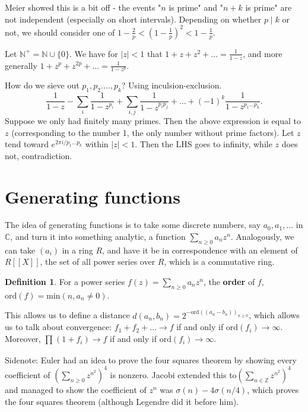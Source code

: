 \documentclass{article}
\theoremstyle{definition}
\newtheorem{defn}{Definition}[section]
\theoremstyle{remark}
\begin{document}
Meier showed this is a bit off - the events "$n$ is prime" and "$n+k$ is prime" are not independent (especially on short intervals). Depending on whether $p \mid k$ or not, we should consider one of $1 - \frac{2}{p} < (1 - \frac{1}{p})^2 < 1 - \frac{1}{p}$.

\vspace{1mm}

Let $\mathbb{N}^+ = \mathbb{N} \cup \{ 0\}$. We have for $|z|<1$ that $1+z+z^2+\ldots = \frac{1}{1-z}$, and more generally $1 + z^p + z^{2p} + \ldots = \frac{1}{1-z^p}$.

How do we sieve out $p_1, p_2. \ldots, p_k$? Using inculsion-exclusion.
\[
\frac{1}{1-z} - \sum_{i}^{} \frac{1}{1-z^{p_i}} + \sum_{i,j}^{} \frac{1}{1-z^{p_i p_j}} + \ldots + (-1)^k \frac{1}{1 - z^{p_1\ldots p_k}}.
\]
Suppose we only had finitely many primes. Then the above expression is equal to $z$ (corresponding to the number 1, the only number without prime factors). Let $z$ tend toward $e^{2\pi i / p_1\ldots p_k}$ within $|z|<1$. Then the LHS goes to infinity, while $z$ does not, contradiction.

\section{Generating functions}

The idea of generating functions is to take some discrete numbers, say $a_0, a_1,\ldots$ in $\mathbb{C}$, and turn it into something analytic, a function $\sum_{n\ge 0}^{} a_nz^n$. Analogously, we can take $(a_i)$ in a ring $R$, and have it be in correspondence with an element of $R[[X]]$, the set of all power series over $R$, which is a commutative ring.
\begin{defn}
    For a power series $f(z) = \sum_{n\ge 0}^{} a_nz^n$, the \textbf{order} of $f$, $\text{ord}(f) = \text{min}(n, a_n \neq 0)$.
\end{defn}
This allows us to define a distance $d(a_n,b_n) = 2^{-\text{ord}((a_n-b_n))_{n\ge 0}}$, which allows us to talk about convergence: $f_1 + f_2 + \ldots \to f$ if and only if $\text{ord}(f_i) \to \infty$. Moreover, $\prod_{}^{} (1+f_i) \to f$ if and only if $\text{ord}(f_i) \to \infty$.
\vspace{1mm}

Sidenote: Euler had an idea to prove the four squares theorem by showing every coefficient of $(\sum_{n\ge 0}^{} z^{n^2})^4$ is nonzero. Jacobi extended this to$(\sum_{n \in \mathbb{Z}}^{} z^{n^2})^4$ and managed to show the coefficient of $z^n$ was $\sigma(n)-4\sigma(n/4)$, which proves the four squares theorem (although Legendre did it before him).
\vspace{2mm}
\end{document}
